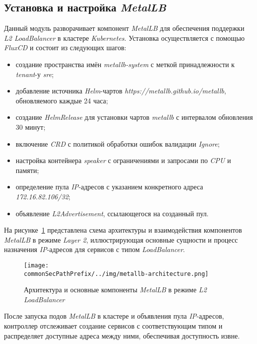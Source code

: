 \subsection{Установка и настройка \textit{MetalLB}}

Данный модуль разворачивает компонент \textit{MetalLB} для обеспечения поддержки \textit{L2 LoadBalancer} в кластере \textit{Kubernetes}. Установка осуществляется с помощью \textit{FluxCD} и состоит из следующих шагов:

\begin{itemize}
    \item создание пространства имён \textit{metallb-system} с меткой принадлежности к \textit{tenant}-у \textit{sre};
    \item добавление источника \textit{Helm}-чартов \textit{https://metallb.github.io/metallb}, обновляемого каждые 24 часа;
    \item создание \textit{HelmRelease} для установки чартов \textit{metallb} с интервалом обновления 30 минут;
    \item включение \textit{CRD} с политикой обработки ошибок валидации \textit{Ignore};
    \item настройка контейнера \textit{speaker} с ограничениями и запросами по \textit{CPU} и памяти;
    \item определение пула \textit{IP}-адресов с указанием конкретного адреса \textit{172.16.82.106/32};
    \item объявление \textit{L2Advertisement}, ссылающегося на созданный пул.
\end{itemize}

На рисунке~\ref{fig:metallb-architecture} представлена схема архитектуры и взаимодействия компонентов \textit{MetalLB} в режиме \textit{Layer 2}, иллюстрирующая основные сущности и процесс назначения \textit{IP}-адресов для сервисов с типом \textit{LoadBalancer}.

\begin{figure}[ht]
    \centering
    \texttt{[image: \\commonSecPathPrefix/../img/metallb-architecture.png]}
    \caption{Архитектура и основные компоненты \textit{MetalLB} в режиме \textit{L2 LoadBalancer}}
    \label{fig:metallb-architecture}
\end{figure}

После запуска подов \textit{MetalLB} в кластере и объявления пула \textit{IP}-адресов, контроллер отслеживает создание сервисов с соответствующим типом и распределяет доступные адреса между ними, обеспечивая доступность извне.


